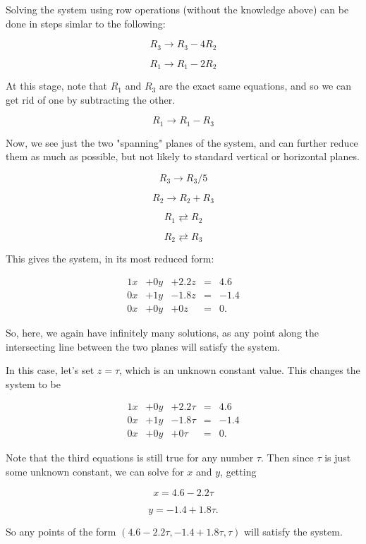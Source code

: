 \documentclass{ximera}
\begin{document}
\begin{exploration}
\begin{example}
\begin{solution}
        Solving the system using row operations (without the knowledge above) can be done in steps simlar to the following:

        $$R_3\rightarrow R_3-4R_2$$

        $$R_1\rightarrow R_1-2R_2$$

        At this stage, note that $R_1$ and $R_3$ are the exact same equations, and so we can get rid of one by subtracting the other.

        $$R_1\rightarrow R_1-R_3$$

        Now, we see just the two "spanning" planes of the system, and can further reduce them as much as possible, but not likely to standard vertical or horizontal planes.

        $$R_3\rightarrow R_3/5$$

        $$R_2\rightarrow R_2+R_3$$

        $$R_1\rightleftarrows R_2$$

        $$R_2\rightleftarrows R_3$$

        This gives the system, in its most reduced form:

        $$\begin{array}{ccccccc}
            1x& +0y&+2.2z &=&4.6 \\
            0x&+1y& -1.8z& =&-1.4\\
            0x &+0y &+0z &=&0.
        \end{array}$$

        So, here, we again have infinitely many solutions, as any point along the intersecting line between the two planes will satisfy the system.

        In this case, let's set $z=\tau$, which is an unknown constant value. This changes the system to be 

        $$\begin{array}{ccccccc}
            1x& +0y&+2.2\tau &=&4.6 \\
            0x&+1y& -1.8\tau& =&-1.4\\
            0x &+0y &+0\tau &=&0.
        \end{array}$$

        Note that the third equations is still true for any number $\tau$. Then since $\tau$ is just some unknown constant, we can solve for $x$ and $y$, getting

        $$x=4.6-2.2\tau$$
        
        $$y=-1.4+1.8\tau.$$

        So any points of the form $(4.6-2.2\tau, -1.4+1.8\tau, \tau)$ will satisfy the system.

    \end{solution}

\end{example}

\end{exploration}
\end{document}
